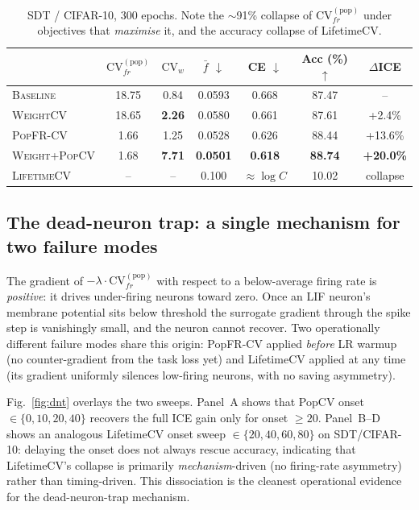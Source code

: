 \documentclass{article}
\begin{document}
\begin{table}[h]
\centering\small
\begin{tabular}{lcccccc}
\toprule
 & $\mathrm{CV}_{fr}^{(\text{pop})}$ & $\mathrm{CV}_w$ & $\bar{f}$ $\downarrow$ & CE $\downarrow$ & Acc (\%) $\uparrow$ & $\Delta$ICE \\ \midrule
\textsc{Baseline}     & 18.75 & 0.84 & 0.0593 & 0.668 & 87.47 & -- \\
\textsc{WeightCV}     & 18.65 & \textbf{2.26} & 0.0580 & 0.661 & 87.61 & +2.4\% \\
\textsc{PopFR-CV}     & 1.66  & 1.25 & 0.0528 & 0.626 & 88.44 & +13.6\% \\
\textsc{Weight+PopCV} & 1.68  & \textbf{7.71} & \textbf{0.0501} & \textbf{0.618} & \textbf{88.74} & \textbf{+20.0\%} \\
\textsc{LifetimeCV}   & -- & -- & 0.100 & $\approx\log C$ & 10.02 & collapse \\
\bottomrule
\end{tabular}
\caption{SDT / CIFAR-10, 300 epochs. Note the $\sim$91\% collapse of $\mathrm{CV}_{fr}^{(\text{pop})}$ under objectives that \emph{maximise} it, and the accuracy collapse of LifetimeCV.}
\label{tab:sdt}
\end{table}

\subsection{The dead-neuron trap: a single mechanism for two failure modes}
\label{sec:res-dnt}

The gradient of $-\lambda \cdot \mathrm{CV}_{fr}^{(\text{pop})}$ with respect to a below-average firing rate is \emph{positive}: it drives under-firing neurons toward zero. Once an LIF neuron's membrane potential sits below threshold the surrogate gradient through the spike step is vanishingly small, and the neuron cannot recover. Two operationally different failure modes share this origin: PopFR-CV applied \emph{before} LR warmup (no counter-gradient from the task loss yet) and LifetimeCV applied at any time (its gradient uniformly silences low-firing neurons, with no saving asymmetry).

Fig.~\ref{fig:dnt} overlays the two sweeps. Panel~A shows that PopCV onset $\in\{0,10,20,40\}$ recovers the full ICE gain only for onset $\geq 20$. Panel~B--D shows an analogous LifetimeCV onset sweep $\in\{20,40,60,80\}$ on SDT/CIFAR-10: delaying the onset does not always rescue accuracy, indicating that LifetimeCV's collapse is primarily \emph{mechanism}-driven (no firing-rate asymmetry) rather than timing-driven. This dissociation is the cleanest operational evidence for the dead-neuron-trap mechanism.
\end{document}
